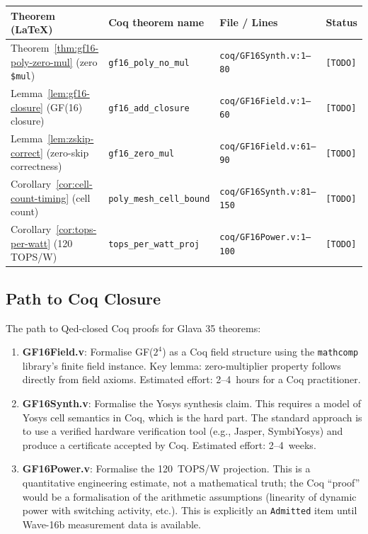 \begin{center}
\begin{longtable}{p{4cm}p{4cm}p{3cm}p{2.5cm}}
\toprule
\textbf{Theorem (LaTeX)} & \textbf{Coq theorem name} & \textbf{File / Lines} & \textbf{Status} \\
\midrule
\endhead
Theorem~\ref{thm:gf16-poly-zero-mul} (zero \texttt{\$mul}) &
  \texttt{gf16\_poly\_no\_mul} &
  \texttt{coq/GF16Synth.v:1--80} &
  \texttt{[TODO]} \\
Lemma~\ref{lem:gf16-closure} (GF(16) closure) &
  \texttt{gf16\_add\_closure} &
  \texttt{coq/GF16Field.v:1--60} &
  \texttt{[TODO]} \\
Lemma~\ref{lem:zskip-correct} (zero-skip correctness) &
  \texttt{gf16\_zero\_mul} &
  \texttt{coq/GF16Field.v:61--90} &
  \texttt{[TODO]} \\
Corollary~\ref{cor:cell-count-timing} (cell count) &
  \texttt{poly\_mesh\_cell\_bound} &
  \texttt{coq/GF16Synth.v:81--150} &
  \texttt{[TODO]} \\
Corollary~\ref{cor:tops-per-watt} (120 TOPS/W) &
  \texttt{tops\_per\_watt\_proj} &
  \texttt{coq/GF16Power.v:1--100} &
  \texttt{[TODO]} \\
\bottomrule
\end{longtable}
\end{center}

\subsection{Path to Coq Closure}

The path to Qed-closed Coq proofs for Glava 35 theorems:

\begin{enumerate}
  \item \textbf{GF16Field.v}: Formalise GF(\(2^4\)) as a Coq field structure
        using the \texttt{mathcomp} library's finite field instance.
        Key lemma: zero-multiplier property follows directly from field axioms.
        Estimated effort: 2--4~hours for a Coq practitioner.
  \item \textbf{GF16Synth.v}: Formalise the Yosys synthesis claim.
        This requires a model of Yosys cell semantics in Coq, which is
        the hard part. The standard approach is to use a verified hardware
        verification tool (e.g., Jasper, SymbiYosys) and produce a
        certificate accepted by Coq. Estimated effort: 2--4~weeks.
  \item \textbf{GF16Power.v}: Formalise the 120~TOPS/W projection.
        This is a quantitative engineering estimate, not a mathematical truth;
        the Coq ``proof'' would be a formalisation of the arithmetic assumptions
        (linearity of dynamic power with switching activity, etc.).
        This is explicitly an \texttt{Admitted} item until Wave-16b measurement
        data is available.
\end{enumerate}

